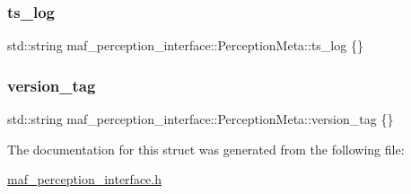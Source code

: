 \subsubsection{\texorpdfstring{ts\+\_\+log}{ts\_log}}
{\footnotesize\ttfamily std\+::string maf\+\_\+perception\+\_\+interface\+::\+Perception\+Meta\+::ts\+\_\+log \{\}}

\mbox{\label{structmaf__perception__interface_1_1PerceptionMeta_aa1923527aed156e61c4367650cd67016}} 
\subsubsection{\texorpdfstring{version\+\_\+tag}{version\_tag}}
{\footnotesize\ttfamily std\+::string maf\+\_\+perception\+\_\+interface\+::\+Perception\+Meta\+::version\+\_\+tag \{\}}



The documentation for this struct was generated from the following file\+:\begin{DoxyCompactItemize}
\item 
\hyperlink{maf__perception__interface_8h}{maf\+\_\+perception\+\_\+interface.\+h}\end{DoxyCompactItemize}
